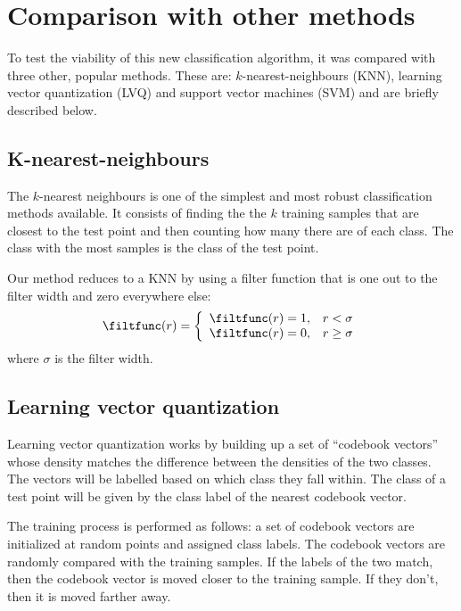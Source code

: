 \section{Comparison with other methods}

To test the viability of this new classification algorithm,
it was compared with three other, popular methods.
These are: $k$-nearest-neighbours (KNN), learning vector quantization (LVQ)
and support vector machines (SVM) and are briefly described
below.

\subsection{K-nearest-neighbours}

The $k$-nearest neighbours is one of the simplest and most robust
classification methods available.  It consists of finding the
the $k$ training samples that are closest to the test point and then
counting how many there are of each class.  The class with the most
samples is the class of the test point.

Our method reduces to a KNN by using a filter function that
is one out to the filter width and zero everywhere else:
\begin{equation}
\filtfunc(r) = \left \lbrace \begin{array}{lr}
\filtfunc(r) = 1 , & r < \sigma \\
\filtfunc(r) = 0 , & r \ge \sigma
\end{array} \right .
\end{equation}
where $\sigma$ is the filter width.

\subsection{Learning vector quantization}

Learning vector quantization works by building up a set of ``codebook vectors''
whose density matches the difference between the densities of the
two classes.  The vectors will be labelled based on which class they
fall within.  The class of a test point will be given by the class
label of the nearest codebook vector.

The training process is performed as follows:  a set of codebook
vectors are initialized at random points and assigned class labels.  
The codebook vectors are randomly compared with the training samples.
If the labels of the two match, then the codebook vector is moved
closer to the training sample.  If they don't, then it is moved farther
away.  \cite{Kohonen2000} \cite{LVQ_PAK}


